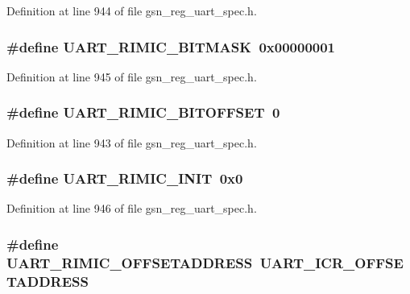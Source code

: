 Definition at line 944 of file gsn\_\-reg\_\-uart\_\-spec.h.

\hypertarget{a00575_af145cd586e58b38b9ec85703ba1e9da2}{
\subsubsection[{UART\_\-RIMIC\_\-BITMASK}]{\setlength{\rightskip}{0pt plus 5cm}\#define UART\_\-RIMIC\_\-BITMASK~0x00000001}}
\label{a00575_af145cd586e58b38b9ec85703ba1e9da2}


Definition at line 945 of file gsn\_\-reg\_\-uart\_\-spec.h.

\hypertarget{a00575_ab90eef6dac8b5827f16d2e509b14861d}{
\subsubsection[{UART\_\-RIMIC\_\-BITOFFSET}]{\setlength{\rightskip}{0pt plus 5cm}\#define UART\_\-RIMIC\_\-BITOFFSET~0}}
\label{a00575_ab90eef6dac8b5827f16d2e509b14861d}


Definition at line 943 of file gsn\_\-reg\_\-uart\_\-spec.h.

\hypertarget{a00575_a96d1360da5ae755741ac072f2e064c6c}{
\subsubsection[{UART\_\-RIMIC\_\-INIT}]{\setlength{\rightskip}{0pt plus 5cm}\#define UART\_\-RIMIC\_\-INIT~0x0}}
\label{a00575_a96d1360da5ae755741ac072f2e064c6c}


Definition at line 946 of file gsn\_\-reg\_\-uart\_\-spec.h.

\hypertarget{a00575_a74cb0e3ae3e8c3310f3c942796b0a2f3}{
\subsubsection[{UART\_\-RIMIC\_\-OFFSETADDRESS}]{\setlength{\rightskip}{0pt plus 5cm}\#define UART\_\-RIMIC\_\-OFFSETADDRESS~UART\_\-ICR\_\-OFFSETADDRESS}}
\label{a00575_a74cb0e3ae3e8c3310f3c942796b0a2f3}


